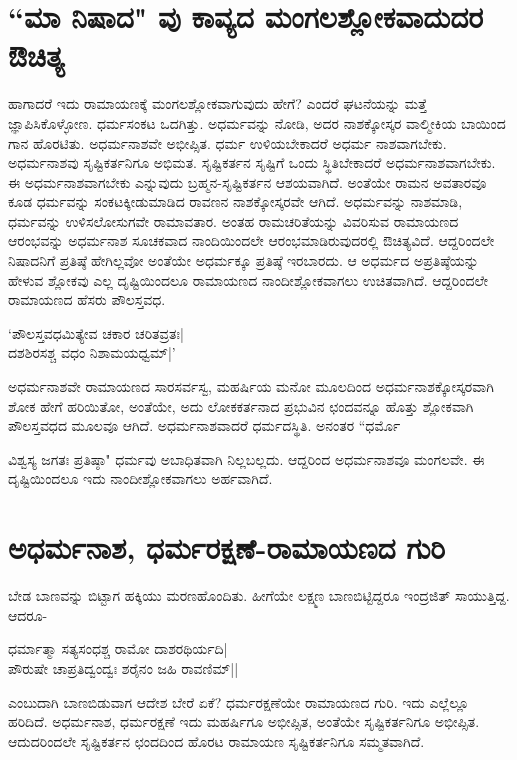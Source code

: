 \section*{``ಮಾ ನಿಷಾದ" ವು ಕಾವ್ಯದ ಮಂಗಲಶ್ಲೋಕವಾದುದರ ಔಚಿತ್ಯ} 

ಹಾಗಾದರೆ ಇದು ರಾಮಾಯಣಕ್ಕೆ ಮಂಗಲಶ್ಲೋಕವಾಗುವುದು ಹೇಗೆ? ಎಂದರೆ ಘಟನೆಯನ್ನು ಮತ್ತೆ ಜ್ಞಾಪಿಸಿಕೊಳ್ಳೋಣ. ಧರ್ಮಸಂಕಟ ಒದಗಿತ್ತು. ಅಧರ್ಮವನ್ನು ನೋಡಿ, ಅದರ ನಾಶಕ್ಕೋಸ್ಕರ ವಾಲ್ಮೀಕಿಯ ಬಾಯಿಂದ ಗಾನ ಹೊರಟಿತು. ಅಧರ್ಮನಾಶವೇ ಅಭೀಪ್ಸಿತ. ಧರ್ಮ ಉಳಿಯಬೇಕಾದರೆ ಅಧರ್ಮ ನಾಶವಾಗಬೇಕು. ಅಧರ್ಮನಾಶವು ಸೃಷ್ಟಿಕರ್ತನಿಗೂ ಅಭಿಮತ. ಸೃಷ್ಟಿಕರ್ತನ ಸೃಷ್ಟಿಗೆ ಒಂದು ಸ್ಥಿತಿಬೇಕಾದರೆ ಅಧರ್ಮನಾಶವಾಗಬೇಕು. ಈ ಅಧರ್ಮನಾಶವಾಗಬೇಕು ಎನ್ನುವುದು ಬ್ರಹ್ಮನ-ಸೃಷ್ಟಿಕರ್ತನ ಆಶಯವಾಗಿದೆ. ಅಂತೆಯೇ ರಾಮನ ಅವತಾರವೂ ಕೂಡ ಧರ್ಮವನ್ನು ಸಂಕಟಕ್ಕೀಡುಮಾಡಿದ ರಾವಣನ ನಾಶಕ್ಕೋಸ್ಕರವೇ ಆಗಿದೆ. ಅಧರ್ಮವನ್ನು ನಾಶಮಾಡಿ, ಧರ್ಮವನ್ನು ಉಳಿಸಲೋಸುಗವೇ ರಾಮಾವತಾರ. ಅಂತಹ ರಾಮಚರಿತೆಯನ್ನು ವಿವರಿಸುವ ರಾಮಾಯಣದ ಆರಂಭವನ್ನು ಅಧರ್ಮನಾಶ ಸೂಚಕವಾದ ನಾಂದಿಯಿಂದಲೇ ಆರಂಭಮಾಡಿರುವುದರಲ್ಲಿ ಔಚಿತ್ಯವಿದೆ. ಆದ್ದರಿಂದಲೇ ನಿಷಾದನಿಗೆ ಪ್ರತಿಷ್ಠೆ ಹೇಗಿಲ್ಲವೋ ಅಂತೆಯೇ ಅಧರ್ಮಕ್ಕೂ ಪ್ರತಿಷ್ಠೆ ಇರಬಾರದು. ಆ ಅಧರ್ಮದ ಅಪ್ರತಿಷ್ಠೆಯನ್ನು ಹೇಳುವ ಶ್ಲೋಕವು ಎಲ್ಲ ದೃಷ್ಟಿಯಿಂದಲೂ ರಾಮಾಯಣದ ನಾಂದೀಶ್ಲೋಕವಾಗಲು ಉಚಿತವಾಗಿದೆ. ಆದ್ದರಿಂದಲೇ ರಾಮಾಯಣದ ಹೆಸರು ಪೌಲಸ್ತವಧ. 

\begin{shloka} 
`ಪೌಲಸ್ತವಧಮಿತ್ಯೇವ ಚಕಾರ ಚರಿತವ್ರತಃ|\\ 
ದಶಶಿರಸಶ್ಚ ವಧಂ ನಿಶಾಮಯಧ್ವಮ್‍|'
\end{shloka}

ಅಧರ್ಮನಾಶವೇ ರಾಮಾಯಣದ ಸಾರಸರ್ವಸ್ವ, ಮಹರ್ಷಿಯ ಮನೋ ಮೂಲದಿಂದ ಅಧರ್ಮನಾಶಕ್ಕೋಸ್ಕರವಾಗಿ ಶೋಕ ಹೇಗೆ ಹರಿಯಿತೋ, ಅಂತೆಯೇ, ಅದು ಲೋಕಕರ್ತನಾದ ಪ್ರಭುವಿನ ಛಂದವನ್ನೂ ಹೊತ್ತು ಶ್ಲೋಕವಾಗಿ ಪೌಲಸ್ತವಧದ ಮೂಲವೂ ಆಗಿದೆ. ಅಧರ್ಮನಾಶವಾದರೆ ಧರ್ಮದಸ್ಥಿತಿ. ಅನಂತರ ``ಧರ್ಮೊ

ವಿಶ್ವಸ್ಯ ಜಗತಃ ಪ್ರತಿಷ್ಠಾ" ಧರ್ಮವು ಅಬಾಧಿತವಾಗಿ ನಿಲ್ಲಬಲ್ಲದು. ಆದ್ದರಿಂದ ಅಧರ್ಮನಾಶವೂ ಮಂಗಲವೇ. ಈ ದೃಷ್ಟಿಯಿಂದಲೂ ಇದು ನಾಂದೀಶ್ಲೋಕವಾಗಲು ಅರ್ಹವಾಗಿದೆ. 

\section*{ಅಧರ್ಮನಾಶ, ಧರ್ಮರಕ್ಷಣೆ-ರಾಮಾಯಣದ ಗುರಿ} 

ಬೇಡ ಬಾಣವನ್ನು ಬಿಟ್ಟಾಗ ಹಕ್ಕಿಯು ಮರಣಹೊಂದಿತು. ಹೀಗೆಯೇ ಲಕ್ಷ್ಮಣ ಬಾಣಬಿಟ್ಟಿದ್ದರೂ ಇಂದ್ರಜಿತ್‍ ಸಾಯುತ್ತಿದ್ದ. ಆದರೂ- 


\begin{shloka}
ಧರ್ಮಾತ್ಮಾ ಸತ್ಯಸಂಧಶ್ಚ ರಾಮೋ ದಾಶರಥಿರ್ಯದಿ|\\ 
ಪೌರುಷೇ ಚಾಪ್ರತಿದ್ವಂದ್ವಃ ಶರೈನಂ ಜ{ಹಿ} ರಾವಣಿಮ್‍||
\end{shloka}

ಎಂಬುದಾಗಿ ಬಾಣಬಿಡುವಾಗ ಆದೇಶ ಬೇರೆ ಏಕೆ? ಧರ್ಮರಕ್ಷಣೆಯೇ ರಾಮಾಯಣದ ಗುರಿ. ಇದು ಎಲ್ಲೆಲ್ಲೂ ಹರಿದಿದೆ. ಅಧರ್ಮನಾಶ, ಧರ್ಮರಕ್ಷಣೆ ಇದು ಮಹರ್ಷಿಗೂ ಅಭೀಪ್ಸಿತ, ಅಂತೆಯೇ ಸೃಷ್ಟಿಕರ್ತನಿಗೂ ಅಭೀಪ್ಸಿತ. ಆದುದರಿಂದಲೇ ಸೃಷ್ಟಿಕರ್ತನ ಛಂದದಿಂದ ಹೊರಟ ರಾಮಾಯಣ ಸೃಷ್ಟಿಕರ್ತನಿಗೂ ಸಮ್ಮತವಾಗಿದೆ. 

